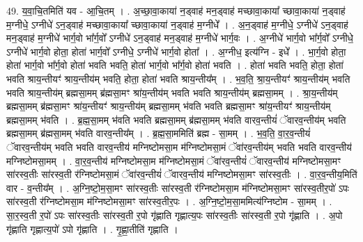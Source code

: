 \documentclass[17pt]{extarticle}
\begin{document}
49. य॒वा॒चि॒तमिति॑ यव - आ॒चि॒तम् । . अ॒च्छा॒वा॒काया॑ न॒ड्वाह॑ मन॒ड्वाह॑ मच्छावा॒काया᳚ च्छावा॒काया॑ न॒ड्वाह॑ म॒ग्नीधे॒ ऽग्नीधे॑ ऽन॒ड्वाह॑ मच्छावा॒काया᳚ च्छावा॒काया॑ न॒ड्वाह॑ म॒ग्नीधे᳚ । . अ॒न॒ड्वाह॑ म॒ग्नीधे॒ ऽग्नीधे॑ ऽन॒ड्वाह॑ मन॒ड्वाह॑ म॒ग्नीधे॑ भार्ग॒वो भा᳚र्ग॒वो᳚ ऽग्नीधे॑ ऽन॒ड्वाह॑ मन॒ड्वाह॑ म॒ग्नीधे॑ भार्ग॒वः । . अ॒ग्नीधे॑ भार्ग॒वो भा᳚र्ग॒वो᳚ ऽग्नीधे॒ ऽग्नीधे॑ भार्ग॒वो होता॒ होता॑ भार्ग॒वो᳚ ऽग्नीधे॒ ऽग्नीधे॑ भार्ग॒वो होता᳚ । . अ॒ग्नीध॒ इत्य॑ग्नि - इधे᳚ । . भा॒र्ग॒वो होता॒ होता॑ भार्ग॒वो भा᳚र्ग॒वो होता॑ भवति भवति॒ होता॑ भार्ग॒वो भा᳚र्ग॒वो होता॑ भवति । . होता॑ भवति भवति॒ होता॒ होता॑ भवति श्राय॒न्तीयꣳ॑ श्राय॒न्तीय॑म् भवति॒ होता॒ होता॑ भवति श्राय॒न्तीय᳚म् । . भ॒व॒ति॒ श्रा॒य॒न्तीयꣳ॑ श्राय॒न्तीय॑म् भवति भवति श्राय॒न्तीय॑म् ब्रह्मसा॒मम् ब्र॑ह्मसा॒मꣳ श्रा॑य॒न्तीय॑म् भवति भवति श्राय॒न्तीय॑म् ब्रह्मसा॒मम् । . श्रा॒य॒न्तीय॑म् ब्रह्मसा॒मम् ब्र॑ह्मसा॒मꣳ श्रा॑य॒न्तीयꣳ॑ श्राय॒न्तीय॑म् ब्रह्मसा॒मम् भ॑वति भवति ब्रह्मसा॒मꣳ श्रा॑य॒न्तीयꣳ॑ श्राय॒न्तीय॑म् ब्रह्मसा॒मम् भ॑वति । . ब्र॒ह्म॒सा॒मम् भ॑वति भवति ब्रह्मसा॒मम् ब्र॑ह्मसा॒मम् भ॑वति वारव॒न्तीयं॑ ॅवारव॒न्तीय॑म् भवति ब्रह्मसा॒मम् ब्र॑ह्मसा॒मम् भ॑वति वारव॒न्तीय᳚म् । . ब्र॒ह्म॒सा॒ममिति॑ ब्रह्म - सा॒मम् । . भ॒व॒ति॒ वा॒र॒व॒न्तीयं॑ ॅवारव॒न्तीय॑म् भवति भवति वारव॒न्तीय॑ मग्निष्टोमसा॒म म॑ग्निष्टोमसा॒मं ॅवा॑रव॒न्तीय॑म् भवति भवति वारव॒न्तीय॑ मग्निष्टोमसा॒मम् । . वा॒र॒व॒न्तीय॑ मग्निष्टोमसा॒म म॑ग्निष्टोमसा॒मं ॅवा॑रव॒न्तीयं॑ ॅवारव॒न्तीय॑ मग्निष्टोमसा॒मꣳ सा॑रस्व॒तीः सा॑रस्व॒ती र॑ग्निष्टोमसा॒मं ॅवा॑रव॒न्तीयं॑ ॅवारव॒न्तीय॑ मग्निष्टोमसा॒मꣳ सा॑रस्व॒तीः । . वा॒र॒व॒न्तीय॒मिति॑ वार - व॒न्तीय᳚म् । . अ॒ग्नि॒ष्टो॒म॒सा॒मꣳ सा॑रस्व॒तीः सा॑रस्व॒ती र॑ग्निष्टोमसा॒म म॑ग्निष्टोमसा॒मꣳ सा॑रस्व॒तीर॒पो॑ ऽपः सा॑रस्व॒ती र॑ग्निष्टोमसा॒म म॑ग्निष्टोमसा॒मꣳ सा॑रस्व॒तीर॒पः । . अ॒ग्नि॒ष्टो॒म॒सा॒ममित्य॑ग्निष्टोम - सा॒मम् । . सा॒र॒स्व॒ती र॒पो॑ ऽपः सा॑रस्व॒तीः सा॑रस्व॒ती र॒पो गृ॑ह्णाति गृह्णात्य॒पः सा॑रस्व॒तीः सा॑रस्व॒ती र॒पो गृ॑ह्णाति । . अ॒पो गृ॑ह्णाति गृह्णात्य॒पो॑ ऽपो गृ॑ह्णाति । . गृ॒ह्णा॒तीति॑ गृह्णाति । \newline
\pagebreak
{}
\end{document}
